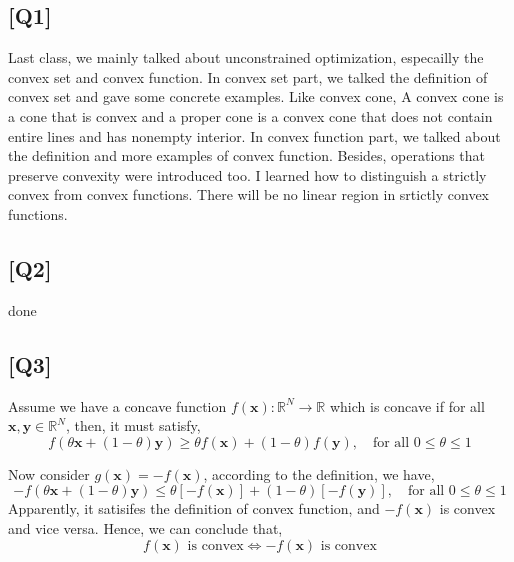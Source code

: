 \documentclass[12pt, a4 paper]{article}
\begin{document}
    \begin{framed}
        \section{[Q1]}
        Last class, we mainly talked about unconstrained optimization, especailly the convex set and
         convex function. In convex set part, we talked the definition of convex set and gave some
         concrete examples. Like convex cone, A convex cone is a cone that is convex and a proper 
         cone is a convex cone that does not contain entire lines and has nonempty interior. 
         In convex function part, we talked about the definition and more examples
         of convex function. Besides, operations that preserve convexity were introduced too.
         I learned how to distinguish a strictly convex from convex functions. There will be no 
         linear region in srtictly convex functions.
    \end{framed}

    \begin{framed}
        \section{[Q2]}
        done
    \end{framed}

    \begin{framed}
    \section{[Q3]}
    Assume we have a concave function $f(\boldsymbol{x}): \mathbb{R}^{N} \to \mathbb{R}$ which is 
concave if for all $\boldsymbol{x}, \boldsymbol{y} \in \mathbb{R}^{N}$, then, it must satisfy,
    $$
        f\left( \theta \boldsymbol{x} + (1-\theta) \boldsymbol{y}
          \right) \geq \theta f(\boldsymbol{x}) + (1-\theta)f(\boldsymbol{y}), 
          \quad \text{for all } 0 \leq \theta \leq 1
    $$

    Now consider $g(\boldsymbol{x}) = -f(\boldsymbol{x})$, according to the definition, we have,
    $$
        -f\left( \theta \boldsymbol{x} + (1-\theta)\boldsymbol{y}  \right) \leq \theta
         \left[-f(\boldsymbol{x})\right] + (1-\theta) \left[-f(\boldsymbol{y})\right],
          \quad \text{for all } 0 \leq \theta \leq 1
    $$
    \indent Apparently, it satisifes the definition of convex function, and $-f(\boldsymbol{x})$
     is convex and vice versa. Hence, we can conclude that,
    $$
    f(\boldsymbol{x}) \text{ is convex} \Longleftrightarrow -f(\boldsymbol{x}) \text{ is convex}
    $$
    \end{framed}
\end{document}
